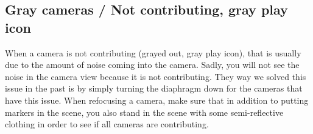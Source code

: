 \documentclass{uva-inf-article}
\begin{document}
\subsection{Gray cameras / Not contributing, gray play icon}
When a camera is not contributing (grayed out, gray play icon), that is usually due to the amount of noise coming into the camera. Sadly, you will not see the noise in the camera view because it is not contributing. They way we solved this issue in the past is by simply turning the diaphragm down for the cameras that have this issue. When refocusing a camera, make sure that in addition to putting markers in the scene, you also stand in the scene with some semi-reflective clothing in order to see if all cameras are contributing.

\printbibliography



\end{document}
